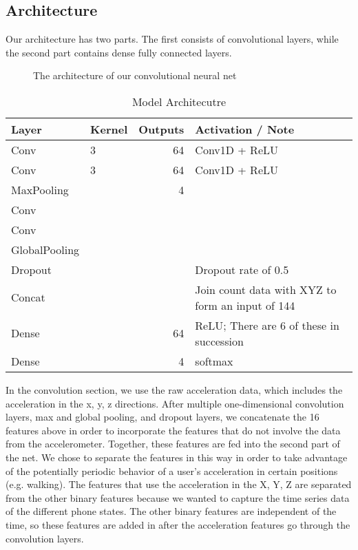 \subsection{Architecture}
Our architecture has two parts.
The first consists of convolutional layers, while the second part contains dense fully connected layers.


\begin{figure*}[!h]
  \vspace{-0.2cm}
  \centering
   {}
  \caption{The architecture of our convolutional neural net}
  \label{fig:ConvNet}
  \vspace{-0.1cm}
\end{figure*}


\begin{table}[!h]
\begin{center}
\begin{tabular}{llrp{2.5cm}}\toprule
Layer &  Kernel & Outputs  &  Activation / Note\\\midrule
Conv  & 3  & 64 &  Conv1D + ReLU \\
Conv  & 3  & 64 & Conv1D + ReLU  \\
MaxPooling   & & 4\\
Conv & & & \\
Conv & & & \\
GlobalPooling & & &\\
Dropout & & & Dropout rate of 0.5\\
Concat   &  & & Join count data with XYZ to form  an input of 144\\
Dense & & 64 & ReLU; There are 6 of these in succession \\
Dense & & 4 & softmax

\end{tabular}
\caption{Model Architecutre}
\label{tab:ArchDescription}
\end{center}
\end{table}

In the convolution section, we use the raw acceleration data, which includes the acceleration in the x, y, z directions. 
After multiple one-dimensional convolution layers, max and global pooling, and dropout layers, 
we concatenate the 16 features above in order to incorporate the features that do not involve the data from the accelerometer.  
Together, these features are fed into the second part of the net.  
We chose to separate the features in this way in order to take advantage of the potentially periodic behavior of a user's acceleration in certain positions (e.g. walking).
The features that use the acceleration in the X, Y, Z are separated from the other binary features because we wanted to capture the time series data of the different phone states.
The other binary features are independent of the time, so these features are added in after the acceleration features go through the convolution layers.  

